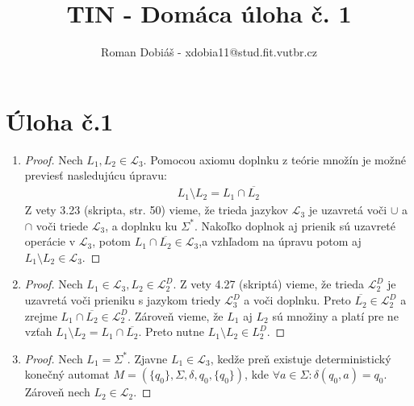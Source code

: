 \documentclass[10pt]{article}
\begin{document}
 
 
 
\title{TIN - Domáca úloha č. 1}%
\author{Roman Dobiáš - xdobia11@stud.fit.vutbr.cz}
 
\maketitle

\section*{Úloha č.1}
\begin{enumerate}
\item 
    \begin{proof}
    Nech $L_1, L_2 \in \mathcal{L}_3$. 
    Pomocou axiomu doplnku z teórie množín je možné previesť nasledujúcu úpravu:
        \begin{align*}
            L_1 \setminus L_2 = L_1 \cap \overline{L_2}
        \end{align*}
    Z vety 3.23 (skripta, str. 50) vieme, že trieda jazykov $\mathcal{L}_3$ je uzavretá voči
    $\cup$ a $\cap$ voči triede $\mathcal{L}_3$, a doplnku ku $\Sigma^{*}$.
            Nakoľko doplnok aj prienik sú uzavreté operácie v $\mathcal{L}_3$, potom $L_1 \cap
    \overline{L_2} \in \mathcal{L}_3$,a vzhľadom na úpravu potom aj $L_1 \setminus L_2 \in
    \mathcal{L}_3$. 
    \end{proof}
\item 
    \begin{proof}
        Nech $L_1 \in \mathcal{L}_3, L_2 \in \mathcal{L}_2^D$. Z vety 4.27 (skriptá) vieme, že trieda
        $\mathcal{L}_2^D$ je uzavretá voči prieniku s jazykom triedy $\mathcal{L}_3^D$ a voči
        doplnku. 
        Preto $\overline{L_2} \in \mathcal{L}_2^D$ a zrejme $L_1 \cap \overline{L_2} \in
        \mathcal{L}_2^D$. Zároveň vieme, že $L_1$ aj $L_2$ sú množiny a platí pre ne vzťah $L_1
        \setminus L_2 = L_1\cap \overline{L_2}$. Preto nutne $L_1\setminus L_2 \in L_2^D$.
    \end{proof}

\item 
    \begin{proof}
    Nech $L_1 = \Sigma^*$. Zjavne $L_1 \in \mathcal{L}_3$, kedže preň existuje deterministický konečný automat $M =
        (\{q_0\},\Sigma, \delta, q_0, \{q_0\})$, kde $\forall a \in \Sigma : \delta(q_0, a) = q_0$.
    Zároveň nech $L_2 \in \mathcal{L}_2$.


\end{proof}
\end{enumerate}
\end{document}
